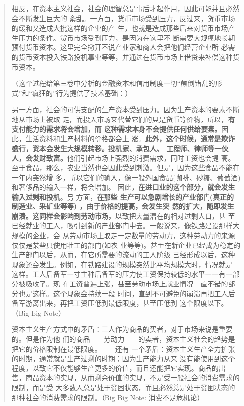 \begin{quotation}
  相反，在资本主义社会，社会的理智总是事后才起作用，因此可能并且必然会不断发生巨大的
  紊乱。一方面，货币市场受到压力，反过来，货币市场的缓和又造成大批这样的企业的产
  生，也就是造成那些后来对货币市场产生压力的条件。货币市场受到压力，是因为在这里不
  断需要大规模地长期预付货币资本。这里完全撇开不说产业家和商人会把他们经营企业所
  必需的货币资本投入铁路投机事业等等，并通过在货币市场上借贷来补偿这种货币资本。

 （这个过程给第三卷中分析的金融资本和信用制度一切“颠倒错乱的形式”和“疯狂的”行为提供了技术基础：） 

 另一方面，社会的可供支配的生产资本受到压力。因为生产资本的要素不断地从市场上被取
 走，而投入市场来代替它们的只是货币等价物，所以，\textbf{有支付能力的需求将会增加，而
   这种需求本身不会提供任何供给要素。}因此，生活资料和生产材料的价格都会上
 涨。\textbf{此外，这个时候，通常是欺诈盛行，资本会发生大规模转移。投机家、承包人、
   工程师、律师等一伙人，会发财致富。}他们引起市场上强烈的消费需求，同时工资也会提
 高。至于食品，那么，农业当然也会因此受到剌激。但是，因为这些食品不能在一年内突然增
 多，所以它们的输入，像一般外国食品(咖啡、砂糖、葡萄酒)和奢侈品的输入一样，将会增加。
 因此，\textbf{在进口业的这个部分，就会发生输入过剩和投机}。另-方面，\textbf{在那些
   生产可以急剧增长的产业部门(真正的制造业、采矿业等等) ，由于价格的提高，会发生突
   然的扩大，随即发生崩溃。这同样会影响到劳动市场，}以致把大量潜在的相对过剩人口，甚
 至已经就业的工人，吸引到新的产业部门中去。一般说来，像铁路建设那样大规模的企业，会
 从劳动市场上取走一定数量的劳动力，这种劳动力的来源仅仅是某些只使用壮工的部门(如农
 业等等)。甚至在新企业已经成为稳定的生产部门以后，从而，在它所需要的流动的工人阶级
 已经形成以后，这种现象还会发生。例如，在铁路建设的规模突然比平均规模大时，情况就是
 这样。工人后备军一寸主种后备军的压力使工资保持较低的水平一一有一部分被吸收了。现
 在工资普遍上涨，甚至劳动市场上就业情况一直不错的部分也是这样。这个现象会持续一段
 时间，直到不可避免的崩溃再把工人后备军游离出来，再把工资压低到最低限度，甚至压低到
 这个限度以下。（Big Big Note） 



 资本主义生产方式中的矛盾：工人作为商品的买者，对于市场来说是重要的。但是作为他
 们的商品——劳动力——的卖者，资本主义社会的趋势是把它的价格限制在最低限度。——还有
 一个矛盾：资本主义生产全力扩张的时期，通常就是生产过剩的时期；因为生产能力从来
 没有能使用到这个程度，以致它不仅能够生产更多的价值，而且还能把它实现。商品的出
 售，商品资本的实现，从而剩余价值的实现，不是受一般社会的消费需求的限制，而是受
 大多数人总是处于贫困状态，而且必然总是处于贫困状态的那种社会的消费需求的限制。（Big Big Note: 消费不足危机论） 


\end{quotation}
